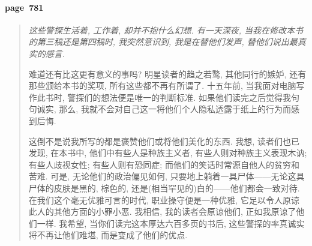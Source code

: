 \paragraph*{page~781}
\begin{quotation}
    \itshape
    这些警探生活着, 工作着, 却并不抱什么幻想. 有一天深夜, 当我在修改本书的第三稿还是第四稿时, 我突然意识到, 我是在替他们发声, 替他们说出最真实的感言.

    难道还有比这更有意义的事吗? 明星读者的趋之若鹜, 其他同行的嫉妒, 还有那些颁给本书的奖项, 所有这些都不再有所谓了. 十五年前, 当我面对电脑写作此书时, 警探们的想法便是唯一的判断标准. 如果他们读完之后觉得我句句诚实, 那么, 我就不会对自己这一将他们个人隐私透露于纸上的行为而感到后悔. 

    这倒不是说我所写的都是褒赞他们或将他们美化的东西. 我想, 读者们也已发现, 在本书中, 他们中有些人是种族主义者, 有些人则对种族主义表现木讷; 有些人歧视女性; 有些人则有恐同症; 而他们的笑话时常源自他人的贫穷和苦难. 可是, 无论他们的政治偏见如何, 只要地上躺着一具尸体------无论这具尸体的皮肤是黑的, 棕色的, 还是(相当罕见的)白的------他们都会一致对待. 在我们这个毫无优雅可言的时代, 职业操守便是一种优雅, 它足以令人原谅此人的其他方面的小罪小恶. 我相信, 我的读者会原谅他们, 正如我原谅了他们一样. 我希望, 当你们读完这本厚达六百多页的书后, 这些警探的率真诚实将不再让他们难堪, 而是变成了他们的优点. 
\end{quotation}